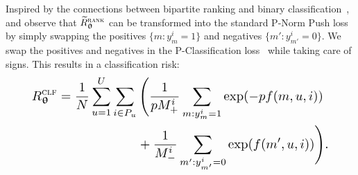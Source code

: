 

Inspired by the connections between bipartite ranking and binary classification~\cite{ertekin2011equivalence,menon2016bipartite},
and observe that $\widetilde R_{{\bm{\uptheta}}}^{\textsc{rank}}$ can be transformed into the standard P-Norm Push loss~\cite{rudin2009p} 
by simply swapping the positives {\small $\{m: y_m^i = 1\}$} and negatives {\small $\{m': y_{m'}^i = 0\}$}. %
We swap the positives and negatives in the P-Classification loss~\cite{ertekin2011equivalence} while taking care of signs.
This results in a classification risk:
\begin{equation}
\label{eq:clfrisk}
\resizebox{.888\linewidth}{!}{$\displaystyle
\begin{aligned}
R_{\upthetabm}^{\textsc{clf}}
= \frac{1}{N} \sum_{u=1}^U 
& \sum_{i \in P_u} \Bigg(
  \frac{1}{p M_+^i} \sum_{m: y_m^i = 1} \exp(-p f(m, u, i)) \\
& \hspace{2em}  + \frac{1}{M_-^i} \sum_{m': y_{m'}^i = 0} \exp(f(m', u, i)) \Bigg).
\end{aligned}
$}
\end{equation}




